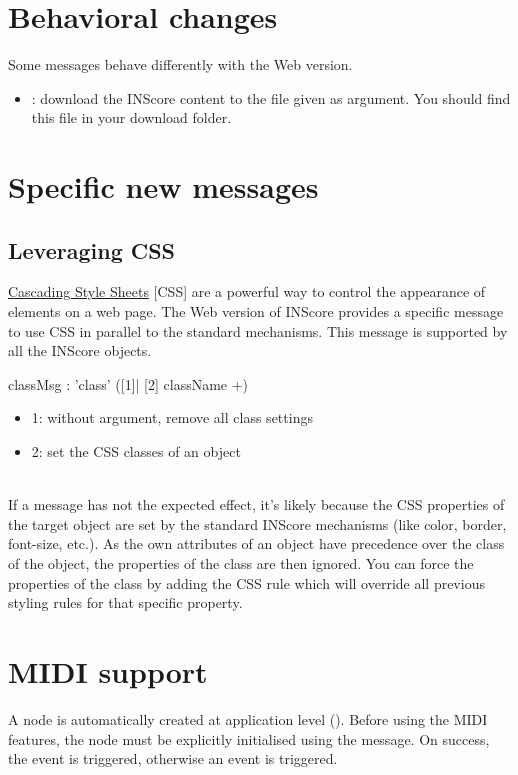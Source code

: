 \documentclass[a4paper,twoside]{article}
\newcommand{\toplevel}[1]	{\section{#1}}
\newcommand{\sublevel}[1]	{\subsection{#1}}
\begin{document}
\toplevel{Behavioral changes}
\label{behavior}

Some messages behave differently with the Web version.
\begin{itemize}
\item {}: download the INScore content to the file given as argument. You should find this file in your download folder.
\end{itemize}


\toplevel{Specific new messages}
\label{newMessages}

\sublevel{Leveraging CSS}
\label{webCSS}

\href{https://www.w3schools.com/css/css_intro.asp}{Cascading Style Sheets} [CSS] are a powerful way to control the appearance of elements on a web page. The Web version of INScore provides a specific  message to use CSS in parallel to the standard mechanisms. This message is supported by all the INScore objects. 

\begin{rail}
classMsg : 'class' ([1]| [2] className +)
\end{rail}

\begin{itemize}
\item 1: without argument, remove all class settings
\item 2: set the CSS classes of an object
\end{itemize}

\note{}\\
If a  message has not the expected effect, it's likely because the CSS properties of the target object are set by the standard INScore mechanisms (like color, border, font-size, etc.). As the own attributes of an object have precedence over the class of the object, the properties of the class are then ignored. You can force the properties of the class by adding the CSS rule  which will override all previous styling rules for that specific property.

\toplevel{MIDI support}
\label{MIDI}

A  node is automatically created at application level ().
Before using the MIDI features, the  node must be explicitly initialised using the  message. On success, the  event is triggered, otherwise an  event is triggered.
\end{document}
